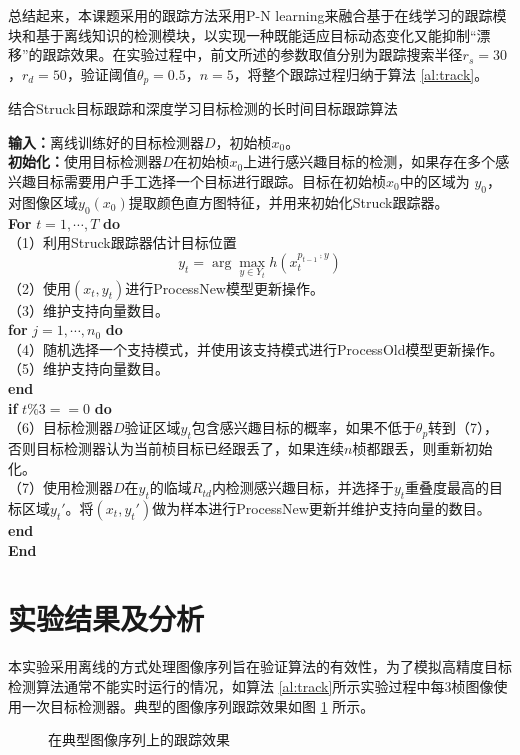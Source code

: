 总结起来，本课题采用的跟踪方法采用P-N learning来融合基于在线学习的跟踪模块和基于离线知识的检测模块，以实现一种既能适应目标动态变化又能抑制``漂移''的跟踪效果。在实验过程中，前文所述的参数取值分别为跟踪搜索半径$r_s=30$，$r_d=50$，验证阈值$\theta_p=0.5$，$n=5$，将整个跟踪过程归纳于算法 \ref{al:track}。
\begin{algorithm}
	\caption{结合Struck目标跟踪和深度学习目标检测的长时间目标跟踪算法}
	\textbf{输入：}离线训练好的目标检测器$D$，初始桢$x_0$。\\
	\textbf{初始化：}使用目标检测器$D$在初始桢$x_0$上进行感兴趣目标的检测，如果存在多个感兴趣目标需要用户手工选择一个目标进行跟踪。目标在初始桢$x_0$中的区域为 $y_0$，对图像区域$y_0(x_0)$提取颜色直方图特征，并用来初始化Struck跟踪器。\\
	\textbf{For} $t=1,\cdots,T$ \textbf{do} \\
	（1）利用Struck跟踪器估计目标位置
		\[
		{y_t} = \arg \mathop {\max }\limits_{y \in {Y_t}} h(x_t^{{p_{t - 1}} \comp y})
		\]
	（2）使用$(x_t,y_t)$进行ProcessNew模型更新操作。\\
	（3）维护支持向量数目。\\
	\textbf{for} $j=1,\cdots,n_0$ \textbf{do}\\
	（4）\hspace{12pt}随机选择一个支持模式，并使用该支持模式进行ProcessOld模型更新操作。\\
	（5）\hspace{12pt}维护支持向量数目。\\
	\textbf{end}\\
	\textbf{if} $t\%3==0$ \textbf{do}\\
	（6）\hspace{12pt}目标检测器$D$验证区域$y_t$包含感兴趣目标的概率，如果不低于$\theta_p$转到（7），否则目标检测器认为当前桢目标已经跟丢了，如果连续$n$桢都跟丢，则重新初始化。\\
	（7）\hspace{12pt}使用检测器$D$在$y_t$的临域$R_{td}$内检测感兴趣目标，并选择于$y_t$重叠度最高的目标区域$y_t'$。将$(x_t,y_t')$做为样本进行ProcessNew更新并维护支持向量的数目。\\
	\textbf{end}\\
	\textbf{End}
	\label{al:track}
\end{algorithm}
\section{实验结果及分析}
本实验采用离线的方式处理图像序列旨在验证算法的有效性，为了模拟高精度目标检测算法通常不能实时运行的情况，如算法 \ref{al:track}所示实验过程中每3桢图像使用一次目标检测器。典型的图像序列跟踪效果如图 \ref{fig:track-result} 所示。
\begin{figure}[h]
	\caption{在典型图像序列上的跟踪效果}
	\label{fig:track-result}
\end{figure}

